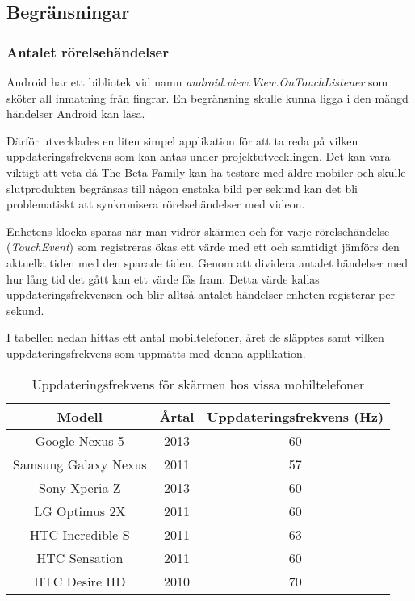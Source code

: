 \subsection{Begränsningar}

\subsubsection{Antalet rörelsehändelser}
\label{touchevents}
Android har ett bibliotek vid namn \emph{android.view.View.OnTouchListener}\parencite{touchlistener} som sköter all inmatning från fingrar. En begränsning skulle kunna ligga i den mängd händelser Android kan läsa. 

Därför utvecklades en liten simpel applikation för att ta reda på vilken uppdateringsfrekvens som kan antas under projektutvecklingen. Det kan vara viktigt att veta då The Beta Family kan ha testare med äldre mobiler och skulle slutprodukten begränsas till någon enstaka bild per sekund kan det bli problematiskt att synkronisera rörelsehändelser med videon.

Enhetens klocka sparas när man vidrör skärmen och för varje rörelsehändelse (\emph{TouchEvent}) som registreras ökas ett värde med ett och samtidigt jämförs den aktuella tiden med den sparade tiden. Genom att dividera antalet händelser med hur lång tid det gått kan ett värde fås fram. Detta värde kallas uppdateringsfrekvensen och blir alltså antalet händelser enheten registerar per sekund.

I tabellen nedan hittas ett antal mobiltelefoner, året de släpptes samt vilken uppdateringsfrekvens som uppmätts med denna applikation.
\begin{table}[h!]
	\begin{center}
	\begin{tabular}{| c | c | c |}
		\hline
		Modell & Årtal & Uppdateringsfrekvens (Hz) \\
		\hline
		Google Nexus 5 & 2013 & 60 \\
    Samsung Galaxy Nexus & 2011 & 57 \\
		Sony Xperia Z & 2013 & 60 \\
		LG Optimus 2X & 2011 & 60 \\
		HTC Incredible S & 2011 & 63 \\
		HTC Sensation & 2011 & 60 \\
		HTC Desire HD & 2010 & 70 \\
		\hline
	\end{tabular}
	\end{center}
	\caption{Uppdateringsfrekvens för skärmen hos vissa mobiltelefoner}
	\label{tab:freq}
\end{table}

